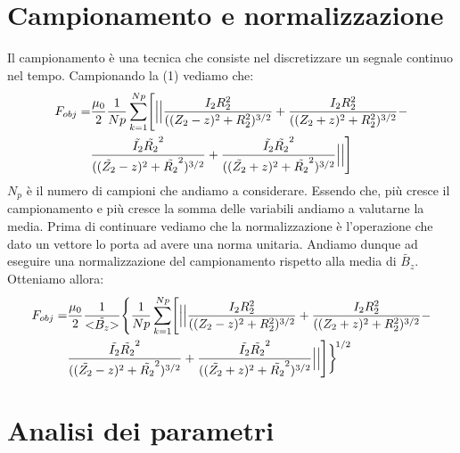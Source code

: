\documentclass[a4paper, 11pt]{article}
\begin{document}
\section*{Campionamento e normalizzazione}

Il campionamento è una tecnica che consiste nel discretizzare un segnale
continuo nel tempo. Campionando la (1) vediamo che: \\

\begin{equation}
	\begin{split}
		F_{obj} = 
	& \frac{\mu_{0}}{2} \frac{1}{Np} \sum\limits_{k=1}^{Np} \Biggl[\Bigl|\Bigl|\frac{I_{2}R_{2}^{2}}{((Z_{2}-z)^{2}+R_{2}^{2})^{3/2}}+\frac{I_{2}R_{2}^{2}}{((Z_{2}+z)^{2}+R_{2}^{2})^{3/2}}- \\
		 & \frac{\tilde{I_{2}}\tilde{R_{2}}^{2}}{((\tilde{Z_{2}}-z)^{2}+\tilde{R_{2}}^{2})^{3/2}}+\frac{\tilde{I_{2}}\tilde{R_{2}}^{2}}{((\tilde{Z_{2}}+z)^{2}+\tilde{R_{2}}^{2})^{3/2}}\Bigr|\Bigr|\Biggr]
	\end{split} 
\end{equation}
\noindent
$N_{p}$ è il numero di campioni che andiamo a considerare. Essendo che, più
cresce il campionamento e più cresce la somma delle variabili andiamo a
valutarne la media. Prima di continuare vediamo che la normalizzazione è
l'operazione che dato un vettore lo porta ad avere una norma unitaria.
Andiamo dunque ad eseguire una normalizzazione del
campionamento rispetto alla media di $\tilde{B_{z}}$. Otteniamo allora: \\
 

\begin{equation}
	\begin{split}
		F_{obj} =
	&  \frac{\mu_{0}}{2} \frac{1}{{\tiny <} \tilde{B_{z}}{\tiny >}} \Biggl\{ \frac{1}{Np} \sum\limits_{k=1}^{Np} \Biggl[\Bigl|\Bigl|\frac{I_{2}R_{2}^{2}}{((Z_{2}-z)^{2}+R_{2}^{2})^{3/2}}+\frac{I_{2}R_{2}^{2}}{((Z_{2}+z)^{2}+R_{2}^{2})^{3/2}}- \\
		 & \frac{\tilde{I_{2}}\tilde{R_{2}}^{2}}{((\tilde{Z_{2}}-z)^{2}+\tilde{R_{2}}^{2})^{3/2}}+\frac{\tilde{I_{2}}\tilde{R_{2}}^{2}}{((\tilde{Z_{2}}+z)^{2}+\tilde{R_{2}}^{2})^{3/2}}\Bigr|\Bigr|\Biggr]\biggr\}^{\!1/2}
	\end{split} 
\end{equation}
\noindent
 
\section*{Analisi dei parametri}
\end{document}
